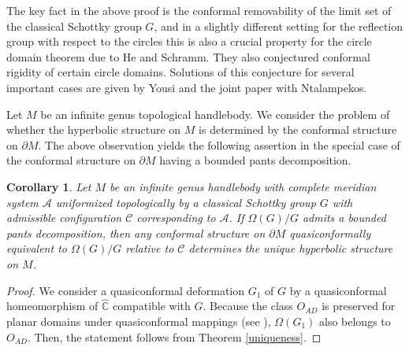 \documentclass[12pt]{amsart}
\theoremstyle{plain}
\newtheorem{cor}[thm]{Corollary}
\begin{document}
The key fact in the above proof is the conformal removability of the limit set of
the classical Schottky group $G$,
and in a slightly different setting for the reflection group with respect to the circles
this is also a crucial property for
the circle domain theorem due to He and Schramm. They also conjectured conformal rigidity of
certain circle domains. Solutions of this conjecture for several important cases are given by
Yousi \cite{Y} and the joint paper \cite{N-Y} with Ntalampekos.

Let $M$ be an infinite genus topological handlebody. 
We consider the  problem of  whether the hyperbolic structure on $M$ is determined by the conformal structure on $\partial M$. The above observation yields 
the following assertion in the  special case of the conformal structure on $\partial M$ having a bounded pants decomposition. 


\begin{cor}\label{cor: uniqueness of handlebody}
Let $M$ be an infinite genus handlebody with  complete
meridian system $\mathcal A$ uniformized topologically by
a classical Schottky group $G$ with  admissible configuration $\mathcal C$ corresponding to $\mathcal A$. If $\Omega(G)/G$ admits a bounded pants decomposition,
then any conformal structure on $\partial M$ quasiconformally equivalent to $\Omega(G)/G$
relative to $\mathcal C$ determines the unique hyperbolic structure on $M$.
\end{cor}

\begin{proof}
We consider a quasiconformal deformation $G_1$ of $G$ by a quasiconformal homeo\-morphism of $\widehat {\mathbb C}$
compatible with $G$. Because the class $O_{AD}$ is preserved for planar domains under quasiconformal mappings
(see \cite[II.15.B]{SN}), $\Omega(G_1)$ also belongs to $O_{AD}$. Then, the statement follows from Theorem \ref{uniqueness}.
\end{proof}
\end{document}
